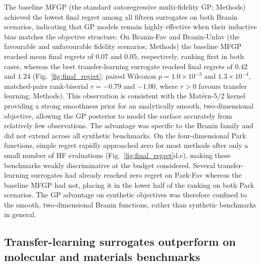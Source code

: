 \documentclass[11pt,a4paper]{article}%
\begin{document}
The baseline MFGP (the standard autoregressive multi-fidelity GP; Methods) achieved the lowest final regret among all fifteen surrogates on both
Branin scenarios, indicating that GP models remain highly effective when
their inductive bias matches the objective structure. On Branin-Fav and Branin-Unfav (the favourable and unfavourable fidelity scenarios; Methods) the baseline MFGP reached
 mean final regrets of $0.07$ and $0.05$, respectively, ranking first in
both cases, whereas the best transfer-learning surrogate reached final regrets of $0.42$ and $1.24$
(Fig.~\ref{fig:final_regret}; paired Wilcoxon $p = 1.0\times10^{-3}$ and
$1.3\times10^{-4}$, matched-pairs rank-biserial $r = -0.79$ and $-1.00$, where $r > 0$
favours transfer learning; Methods). This observation is consistent with the Mat\'{e}rn-5/2 kernel providing a strong smoothness prior for an analytically smooth, two-dimensional objective,
allowing the GP posterior to model the surface accurately from relatively few observations.
The advantage was specific to the Branin family and did not extend across all synthetic benchmarks. On the four-dimensional Park functions, simple regret rapidly approached zero for most methods after only a small number of HF evaluations (Fig.~\ref{fig:final_regret}d,e), making these benchmarks weakly
 discriminative  at the budget considered. Several transfer-learning surrogates had already reached zero regret on Park-Fav whereas the baseline MFGP had not, placing it
in the lower half of the ranking on both Park scenarios. The GP advantage on
synthetic objectives was therefore confined to the smooth, two-dimensional Branin
functions, rather than synthetic benchmarks in general.

\subsection{Transfer-learning surrogates outperform on molecular and materials
benchmarks}\label{sec:res-chem}
\end{document}
